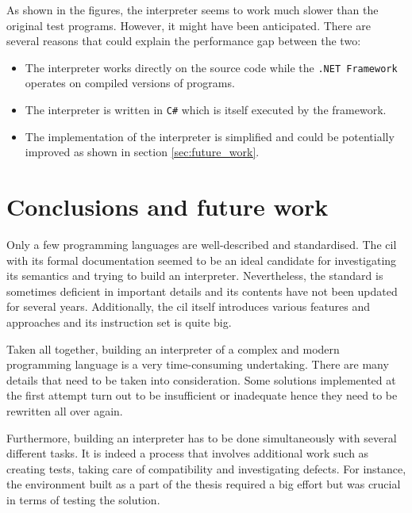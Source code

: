 \documentclass[declaration,shortabstract,english,mgr]{iithesis}
\begin{document}
As shown in the figures, the interpreter seems to work much slower than the original test programs. However, it might have been anticipated. There are several reasons that could explain the performance gap between the two:
\begin{itemize}
	\item{The interpreter works directly on the source code while the \texttt{.NET Framework} operates on compiled versions of programs.}
	\item{The interpreter is written in \texttt{C\#} which is itself executed by the framework.}
	\item{The implementation of the interpreter is simplified and could be potentially improved as shown in section \ref{sec:future_work}.}
\end{itemize}

\clearpage


\chapter{Conclusions and future work}
\label{sec:conclusions}

Only a few programming languages are well-described and standardised. The \acrshort{cil} with its formal documentation seemed to be an ideal candidate for investigating its semantics and trying to build an interpreter. Nevertheless, the standard is sometimes deficient in important details and its contents have not been updated for several years.
Additionally, the \acrshort{cil} itself introduces various features and approaches and its instruction set is quite big.

Taken all together, building an interpreter of a complex and modern programming language is a very time-consuming undertaking. There are many details that need to be taken into consideration. Some solutions implemented at the first attempt turn out to be insufficient or inadequate hence they need to be rewritten all over again.

Furthermore, building an interpreter has to be done simultaneously with several different tasks. It is indeed a process that involves additional work such as creating tests, taking care of compatibility and investigating defects. For instance, the environment built as a part of the thesis required a big effort but was crucial in terms of testing the solution.
\end{document}

